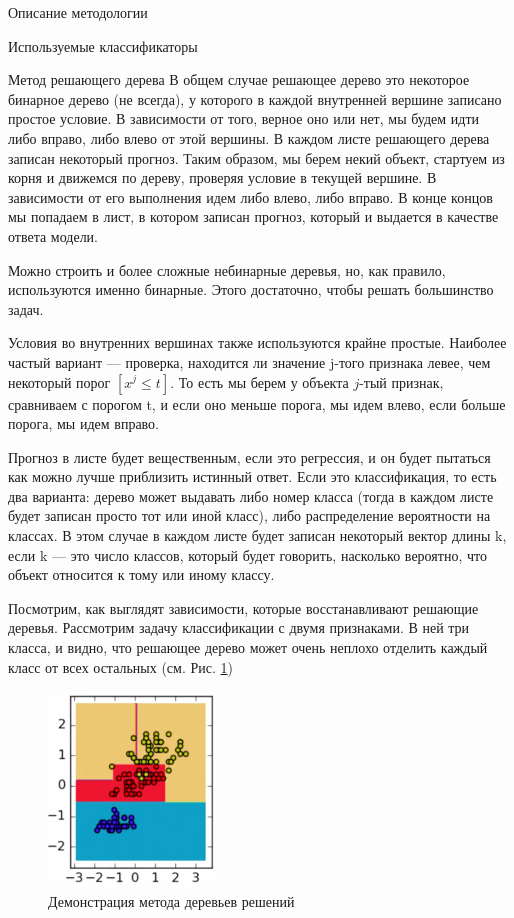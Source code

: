 \begin{section}{Описание методологии}
\begin{subsection}{Используемые классификаторы}
\begin{subsubsection}{Метод решающего дерева}
 В общем случае решающее дерево это некоторое бинарное дерево (не всегда), у которого в каждой внутренней вершине записано простое условие. В зависимости от того, верное оно или нет, мы будем идти либо вправо, либо влево от этой вершины. В каждом листе решающего дерева записан некоторый прогноз. Таким образом, мы берем некий объект, стартуем из корня и движемся по дереву, проверяя условие в текущей вершине. В зависимости от его выполнения идем либо влево, либо вправо. В конце концов мы попадаем в лист, в котором записан прогноз, который и выдается в качестве ответа модели.

 Можно строить и более сложные небинарные деревья, но, как правило, используются именно бинарные. Этого достаточно, чтобы решать большинство задач.


 Условия во внутренних вершинах также используются крайне простые. Наиболее частый вариант — проверка, находится ли значение j-того признака левее, чем некоторый порог $[x^j \leq t]$. То есть мы берем у объекта $j$-тый признак, сравниваем с порогом t, и если оно меньше порога, мы идем влево, если больше порога, мы идем вправо.


  Прогноз в листе будет вещественным, если это регрессия, и он будет пытаться как можно лучше приблизить истинный ответ. Если это классификация, то есть два варианта: дерево может выдавать либо номер класса (тогда в каждом листе будет записан просто тот или иной класс), либо распределение вероятности на классах. В этом случае в каждом листе будет записан некоторый вектор длины k, если k — это число классов, который будет говорить, насколько вероятно, что объект относится к тому или иному классу.

  Посмотрим, как выглядят зависимости, которые восстанавливают решающие деревья. Рассмотрим задачу классификации с двумя признаками. В ней три класса, и видно, что решающее дерево может очень неплохо отделить каждый класс от всех остальных (см. Рис. \ref{pic:dt2})


  \begin{figure}[ht!]
\centering
\includegraphics[width=0.4\textwidth]{pics/dt2}
\caption{Демонстрация метода деревьев решений}
\label{pic:dt2}
\end{figure}


\end{subsubsection}
\end{subsection}
\end{section}
